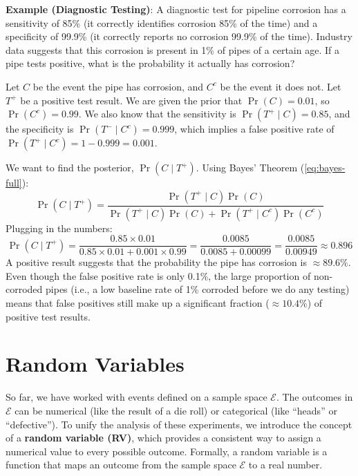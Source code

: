 \begin{exampleBox}
    \textbf{Example (Diagnostic Testing)}: A diagnostic test for pipeline corrosion has a sensitivity of 85\% (it correctly identifies corrosion 85\% of the time) and a specificity of 99.9\% (it correctly reports no corrosion 99.9\% of the time). Industry data suggests that this corrosion is present in 1\% of pipes of a certain age. If a pipe tests positive, what is the probability it actually has corrosion?

    Let $C$ be the event the pipe has corrosion, and $C^c$ be the event it does not. Let $T^+$ be a positive test result. We are given the prior that $\Pr(C) = 0.01$, so $\Pr(C^c) = 0.99$. We also know that the sensitivity is $\Pr(T^+ \mid C)=0.85$, and the specificity is $\Pr(T^- \mid C^c)=0.999$, which implies a false positive rate of $\Pr(T^+ \mid C^c) = 1 - 0.999 = 0.001$.

    We want to find the posterior, $\Pr(C \mid T^+)$. Using Bayes' Theorem (\autoref{eq:bayes-full}):
    \begin{equation}
        \Pr(C \mid T^+) = \frac{\Pr(T^+ \mid C)\Pr(C)}{\Pr(T^+ \mid C)\Pr(C) + \Pr(T^+ \mid C^c)\Pr(C^c)}
    \end{equation}
    Plugging in the numbers:
    \begin{equation}
        \Pr(C \mid T^+) = \frac{0.85 \times 0.01}{0.85 \times 0.01 + 0.001 \times 0.99} = \frac{0.0085}{0.0085 + 0.00099} = \frac{0.0085}{0.00949} \approx 0.896
    \end{equation}
    A positive result suggests that the probability the pipe has corrosion is $\approx 89.6\%$. Even though the false positive rate is only 0.1\%, the large proportion of non-corroded pipes (i.e., a low baseline rate of 1\% corroded before we do any testing) means that false positives still make up a significant fraction ($\approx 10.4\%$) of positive test results.
\end{exampleBox}

\section{Random Variables}
So far, we have worked with events defined on a sample space $\mathcal{E}$. The outcomes in $\mathcal{E}$ can be numerical (like the result of a die roll) or categorical (like ``heads'' or ``defective''). To unify the analysis of these experiments, we introduce the concept of a \textbf{random variable (RV)}, which provides a consistent way to assign a numerical value to every possible outcome. Formally, a random variable is a function that maps an outcome from the sample space $\mathcal{E}$ to a real number.

